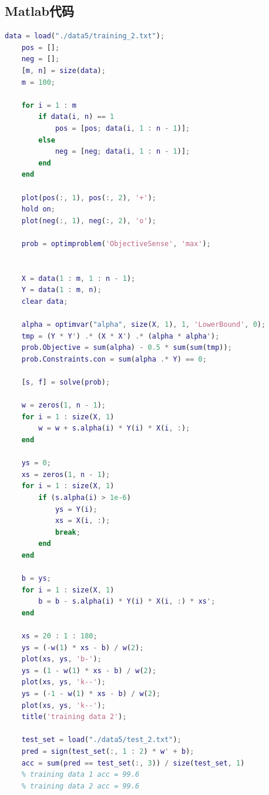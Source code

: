 \documentclass{article}
\begin{document}
\subsection{Matlab代码}
\begin{lstlisting}[language=matlab]
	data = load("./data5/training_2.txt");
	pos = [];
	neg = [];
	[m, n] = size(data);
	m = 100;
	
	for i = 1 : m
		if data(i, n) == 1
			pos = [pos; data(i, 1 : n - 1)];
		else
			neg = [neg; data(i, 1 : n - 1)];
		end
	end
	
	plot(pos(:, 1), pos(:, 2), '+');
	hold on;
	plot(neg(:, 1), neg(:, 2), 'o');
	
	prob = optimproblem('ObjectiveSense', 'max');
	 
	
	X = data(1 : m, 1 : n - 1);
	Y = data(1 : m, n);
	clear data;
	
	alpha = optimvar("alpha", size(X, 1), 1, 'LowerBound', 0);
	tmp = (Y * Y') .* (X * X') .* (alpha * alpha');
	prob.Objective = sum(alpha) - 0.5 * sum(sum(tmp));
	prob.Constraints.con = sum(alpha .* Y) == 0;
	
	[s, f] = solve(prob);
	
	w = zeros(1, n - 1);
	for i = 1 : size(X, 1)
		w = w + s.alpha(i) * Y(i) * X(i, :);
	end
	
	ys = 0;
	xs = zeros(1, n - 1);
	for i = 1 : size(X, 1)
		if (s.alpha(i) > 1e-6)
			ys = Y(i);
			xs = X(i, :);
			break;
		end
	end
	
	b = ys;
	for i = 1 : size(X, 1)
		b = b - s.alpha(i) * Y(i) * X(i, :) * xs';
	end
	
	xs = 20 : 1 : 180;
	ys = (-w(1) * xs - b) / w(2);
	plot(xs, ys, 'b-');
	ys = (1 - w(1) * xs - b) / w(2);
	plot(xs, ys, 'k--');
	ys = (-1 - w(1) * xs - b) / w(2);
	plot(xs, ys, 'k--');
	title('training data 2');
	
	test_set = load("./data5/test_2.txt");
	pred = sign(test_set(:, 1 : 2) * w' + b);
	acc = sum(pred == test_set(:, 3)) / size(test_set, 1)
	% training data 1 acc = 99.6
	% training data 2 acc = 99.6
\end{lstlisting}
\end{document}
